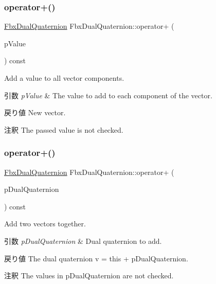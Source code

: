\subsubsection{\texorpdfstring{operator+()}{operator+()}\hspace{0.1cm}{\footnotesize\ttfamily [1/2]}}
{\footnotesize\ttfamily \hyperlink{class_fbx_dual_quaternion}{Fbx\+Dual\+Quaternion} Fbx\+Dual\+Quaternion\+::operator+ (\begin{DoxyParamCaption}\item[{double}]{p\+Value }\end{DoxyParamCaption}) const}

Add a value to all vector components. 
\begin{DoxyParams}{引数}
{\em p\+Value} & The value to add to each component of the vector. \\
\hline
\end{DoxyParams}
\begin{DoxyReturn}{戻り値}
New vector. 
\end{DoxyReturn}
\begin{DoxyRemark}{注釈}
The passed value is not checked. 
\end{DoxyRemark}
\mbox{\label{class_fbx_dual_quaternion_a7d1c0685181fa8bdffed35a70e99d2e2}} 
\subsubsection{\texorpdfstring{operator+()}{operator+()}\hspace{0.1cm}{\footnotesize\ttfamily [2/2]}}
{\footnotesize\ttfamily \hyperlink{class_fbx_dual_quaternion}{Fbx\+Dual\+Quaternion} Fbx\+Dual\+Quaternion\+::operator+ (\begin{DoxyParamCaption}\item[{const \hyperlink{class_fbx_dual_quaternion}{Fbx\+Dual\+Quaternion} \&}]{p\+Dual\+Quaternion }\end{DoxyParamCaption}) const}

Add two vectors together. 
\begin{DoxyParams}{引数}
{\em p\+Dual\+Quaternion} & Dual quaternion to add. \\
\hline
\end{DoxyParams}
\begin{DoxyReturn}{戻り値}
The dual quaternion v\textquotesingle{} = this + p\+Dual\+Quaternion. 
\end{DoxyReturn}
\begin{DoxyRemark}{注釈}
The values in p\+Dual\+Quaternion are not checked. 
\end{DoxyRemark}
\mbox{\label{class_fbx_dual_quaternion_a0b701dcff5e3982a9728241932dff65a}} 

